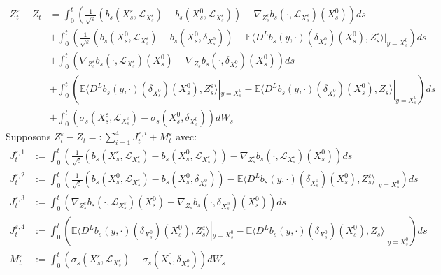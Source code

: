\documentclass[12pt,a4paper,twoside,fleqn]{book}%
\theoremstyle{definition}
\theoremstyle{lemme}
\numberwithin{equation}{section}
\begin{document}
\[
\begin{aligned}
	Z_t^\varepsilon - Z_t &= \int_0^t \left(\frac{1}{\sqrt{\varepsilon}}(b_s(X_s^\varepsilon, \mathcal{L}_{X_s^\varepsilon}) - b_s(X_s^0, \mathcal{L}_{X_s^\varepsilon})) - \nabla_{Z_s^\varepsilon}b_s(\cdot, \mathcal{L}_{X_s^\varepsilon})(X_s^0)\right)ds\\
	&+ \int_0^t \left(\frac{1}{\sqrt{\varepsilon}}(b_s(X_s^0, \mathcal{L}_{X_s^\varepsilon}) - b_s(X_s^0, \delta_{X_s^0})) - \mathbb{E}\langle D^L b_s(y, \cdot)(\delta_{X_s^0})(X_s^0), Z_s^\varepsilon\rangle|_{y=X_s^0}\right)ds\\
	&+ \int_0^t \left(\nabla_{Z_s^\varepsilon}b_s(\cdot, \mathcal{L}_{X_s^\varepsilon})(X_s^0) - \nabla_{Z_s}b_s(\cdot, \delta_{X_s^0})(X_s^0)\right)ds\\
	&+ \int_0^t \left(\mathbb{E}\langle D^L b_s(y, \cdot)(\delta_{X_s^0})(X_s^0), Z_s^\varepsilon\rangle|_{y=X_s^0} - \mathbb{E}\langle D^L b_s(y, \cdot)(\delta_{X_s^0})(X_s^0), Z_s\rangle|_{y=X_s^0}\right)ds\\
	&+ \int_0^t \left(\sigma_s(X_s^\varepsilon, \mathcal{L}_{X_s^\varepsilon}) - \sigma_s(X_s^0, \delta_{X_s^0})\right)dW_s
\end{aligned}\]
Supposons $Z_t^\varepsilon - Z_t=:\sum_{i=1}^{4}J_t^{\varepsilon,i} + M_t^\varepsilon$ avec:
\[
\begin{aligned}
J_t^{\varepsilon,1}&:=\int_0^t \left(\frac{1}{\sqrt{\varepsilon}}(b_s(X_s^\varepsilon, \mathcal{L}_{X_s^\varepsilon}) - b_s(X_s^0, \mathcal{L}_{X_s^\varepsilon})) - \nabla_{Z_s^\varepsilon}b_s(\cdot, \mathcal{L}_{X_s^\varepsilon})(X_s^0)\right)ds\\
J_t^{\varepsilon,2}&:=\int_0^t \left(\frac{1}{\sqrt{\varepsilon}}(b_s(X_s^0, \mathcal{L}_{X_s^\varepsilon}) - b_s(X_s^0, \delta_{X_s^0})) - \mathbb{E}\langle D^L b_s(y, \cdot)(\delta_{X_s^0})(X_s^0), Z_s^\varepsilon\rangle|_{y=X_s^0}\right)ds\\
J_t^{\varepsilon,3}&:=\int_0^t \left(\nabla_{Z_s^\varepsilon}b_s(\cdot, \mathcal{L}_{X_s^\varepsilon})(X_s^0) - \nabla_{Z_s}b_s(\cdot, \delta_{X_s^0})(X_s^0)\right)ds\\
J_t^{\varepsilon,4}&:= \int_0^t \left(\mathbb{E}\langle D^L b_s(y, \cdot)(\delta_{X_s^0})(X_s^0), Z_s^\varepsilon\rangle|_{y=X_s^0} - \mathbb{E}\langle D^L b_s(y, \cdot)(\delta_{X_s^0})(X_s^0), Z_s\rangle|_{y=X_s^0}\right)ds\\
M_t^\varepsilon&:= \int_0^t \left(\sigma_s(X_s^\varepsilon, \mathcal{L}_{X_s^\varepsilon}) - \sigma_s(X_s^0, \delta_{X_s^0})\right)dW_s
\end{aligned}
\]
\end{document}
